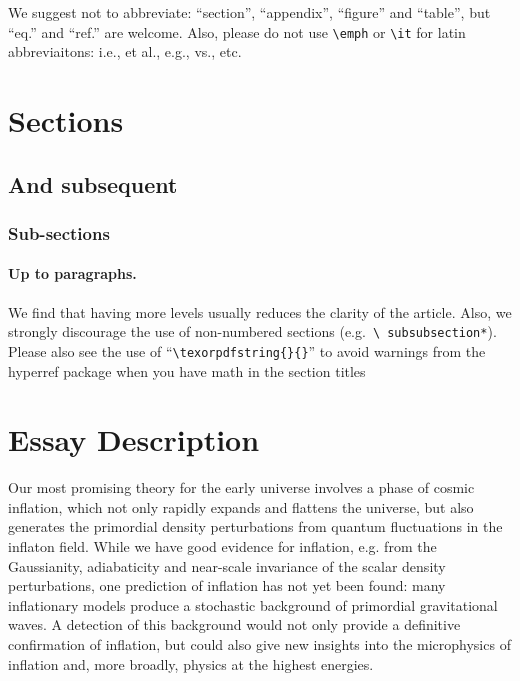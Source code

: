 \documentclass[a4paper,11pt]{article}
\begin{document}
We suggest not to abbreviate: ``section'', ``appendix'', ``figure''
and ``table'', but ``eq.'' and ``ref.'' are welcome. Also, please do
not use \texttt{\textbackslash emph} or \texttt{\textbackslash it} for
latin abbreviaitons: i.e., et al., e.g., vs., etc.



\section{Sections}
\subsection{And subsequent}
\subsubsection{Sub-sections}
\paragraph{Up to paragraphs.} We find that having more levels usually
reduces the clarity of the article. Also, we strongly discourage the
use of non-numbered sections (e.g.~\texttt{\textbackslash
  subsubsection*}).  Please also see the use of
``\texttt{\textbackslash texorpdfstring\{\}\{\}}'' to avoid warnings
from the hyperref package when you have math in the section titles



\appendix
\section{Essay Description}
Our most promising theory for the early universe involves a phase of cosmic inflation, which not only rapidly expands and flattens the universe, but also generates the primordial density perturbations from quantum fluctuations in the inflaton field. While we have good evidence for inflation, e.g. from the Gaussianity, adiabaticity and near-scale invariance of the scalar density perturbations, one prediction of inflation has not yet been found: many inflationary models produce a stochastic background of primordial gravitational waves. A detection of this background would not only provide a definitive confirmation of inflation, but could also give new insights into the microphysics of inflation and, more broadly, physics at the highest energies.\\
\end{document}
